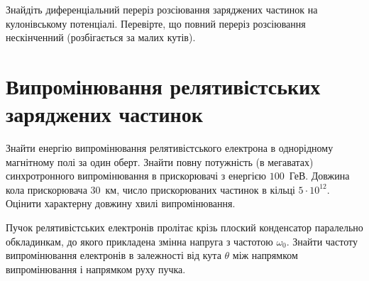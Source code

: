 \begin{problem}
Знайдіть диференціальний переріз розсіювання заряджених частинок на кулонівському потенціалі. Перевірте, що повний переріз розсіювання нескінченний (розбігається за малих кутів).
\end{problem}

\section{Випромінювання релятивістських заряджених частинок}

\begin{problem}%
Знайти енергію випромінювання релятивістського електрона в однорідному магнітному полі за один оберт. Знайти повну потужність (в мегаватах) синхротронного випромінювання в прискорювачі з енергією $100$~ГеВ. Довжина кола прискорювача $30$~км, число прискорюваних частинок в кільці $5\cdot 10^{12}$. Оцінити характерну довжину хвилі випромінювання.
\end{problem}

\begin{problem}%
Пучок релятивістських електронів пролітає крізь плоский конденсатор паралельно обкладинкам, до якого прикладена змінна напруга з частотою $\omega_0$. Знайти частоту випромінювання електронів в залежності від кута $\theta$ між напрямком випромінювання і напрямком руху пучка.
\end{problem}



